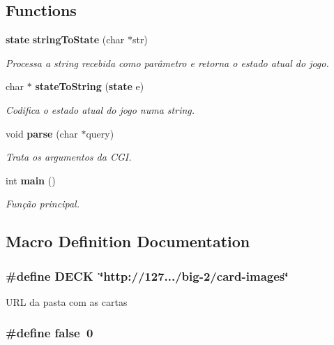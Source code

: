 \subsection*{Functions}
\begin{DoxyCompactItemize}
\item 
{\bf state} {\bf string\+To\+State} (char $\ast$str)
\begin{DoxyCompactList}\small\item\em Processa a string recebida como parâmetro e retorna o estado atual do jogo. \end{DoxyCompactList}\item 
char $\ast$ {\bf state\+To\+String} ({\bf state} e)
\begin{DoxyCompactList}\small\item\em Codifica o estado atual do jogo numa string. \end{DoxyCompactList}\item 
void {\bf parse} (char $\ast$query)
\begin{DoxyCompactList}\small\item\em Trata os argumentos da C\+GI. \end{DoxyCompactList}\item 
int {\bf main} ()
\begin{DoxyCompactList}\small\item\em Função principal. \end{DoxyCompactList}\end{DoxyCompactItemize}


\subsection{Macro Definition Documentation}
\subsubsection[{D\+E\+CK}]{\setlength{\rightskip}{0pt plus 5cm}\#define D\+E\+CK~\char`\"{}http\+://127.../big-\/2/card-\/images\char`\"{}}\label{_main_8c_ac662f6935027ccbb88b890f88344b9b0}
U\+RL da pasta com as cartas 
\subsubsection[{false}]{\setlength{\rightskip}{0pt plus 5cm}\#define false~0}\label{_main_8c_a65e9886d74aaee76545e83dd09011727}
